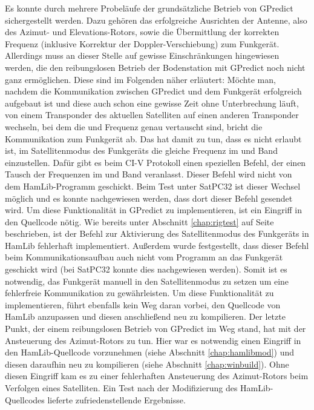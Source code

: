 Es konnte durch mehrere Probeläufe der grundsätzliche Betrieb von GPredict sichergestellt werden. Dazu gehören das erfolgreiche Ausrichten der Antenne, also des Azimut- und Elevations-Rotors, sowie die Übermittlung der korrekten Frequenz (inklusive Korrektur der Doppler-Verschiebung) zum Funkgerät. Allerdings muss an dieser Stelle auf gewisse Einschränkungen hingewiesen werden, die den reibungslosen Betrieb der Bodenstation mit GPredict noch nicht ganz ermöglichen. Diese sind im Folgenden näher erläutert:\newpar
Möchte man, nachdem die Kommunikation zwischen GPredict und dem Funkgerät erfolgreich aufgebaut ist und diese auch schon eine gewisse Zeit ohne Unterbrechung läuft, von einem Transponder des aktuellen Satelliten auf einen anderen Transponder wechseln, bei dem die  und Frequenz genau vertauscht sind, bricht die Kommunikation zum Funkgerät ab. Das hat damit zu tun, dass es nicht erlaubt ist, im Satellitenmodus des Funkgeräts die gleiche Frequenz im  und Band einzustellen. Dafür gibt es beim CI-V Protokoll einen speziellen Befehl, der einen Tausch der Frequenzen im  und Band veranlasst. Dieser Befehl wird nicht von dem HamLib-Programm  geschickt. Beim Test unter SatPC32 ist dieser Wechsel möglich und es konnte nachgewiesen werden, dass dort dieser Befehl gesendet wird. Um diese Funktionalität in GPredict zu implementieren, ist ein Eingriff in den Quellcode nötig.\newpar
Wie bereits unter Abschnitt \ref{chap:rigtest} auf Seite \pageref{satmode} beschrieben, ist der Befehl zur Aktivierung des Satellitenmodus des Funkgeräts in HamLib fehlerhaft implementiert. Außerdem wurde festgestellt, dass dieser Befehl beim Kommunikationsaufbau auch nicht vom Programm  an das Funkgerät geschickt wird (bei SatPC32 konnte dies nachgewiesen werden). Somit ist es notwendig, das Funkgerät manuell in den Satellitenmodus zu setzen um eine fehlerfreie Kommunikation zu gewährleisten. Um diese Funktionalität zu implementieren, führt ebenfalls kein Weg daran vorbei, den Quellcode von HamLib anzupassen und diesen anschließend neu zu kompilieren.\newpar
Der letzte Punkt, der einem reibungslosen Betrieb von GPredict im Weg stand, hat mit der Ansteuerung des Azimut-Rotors zu tun. Hier war es notwendig einen Eingriff in den HamLib-Quellcode vorzunehmen (siehe Abschnitt \ref{chap:hamlibmod}) und diesen daraufhin neu zu kompilieren (siehe Abschnitt \ref{chap:winbuild}). Ohne diesen Eingriff kam es zu einer fehlerhaften Ansteuerung des Azimut-Rotors beim Verfolgen eines Satelliten. Ein Test nach der Modifizierung des HamLib-Quellcodes lieferte zufriedenstellende Ergebnisse.\newpar